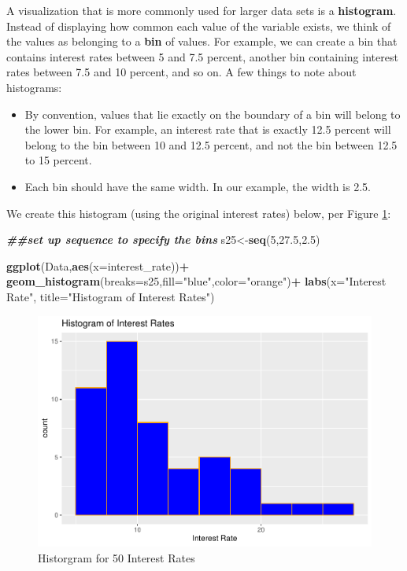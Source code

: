 \documentclass[
]{book}
\newenvironment{Shaded}{\begin{snugshade}}{\end{snugshade}}
\newcommand{\AttributeTok}[1]{\textcolor[rgb]{0.13,0.29,0.53}{#1}}
\newcommand{\DecValTok}[1]{\textcolor[rgb]{0.00,0.00,0.81}{#1}}
\newcommand{\DocumentationTok}[1]{\textcolor[rgb]{0.56,0.35,0.01}{\textbf{\textit{#1}}}}
\newcommand{\FloatTok}[1]{\textcolor[rgb]{0.00,0.00,0.81}{#1}}
\newcommand{\FunctionTok}[1]{\textcolor[rgb]{0.13,0.29,0.53}{\textbf{#1}}}
\newcommand{\NormalTok}[1]{#1}
\newcommand{\OtherTok}[1]{\textcolor[rgb]{0.56,0.35,0.01}{#1}}
\newcommand{\SpecialCharTok}[1]{\textcolor[rgb]{0.81,0.36,0.00}{\textbf{#1}}}
\newcommand{\StringTok}[1]{\textcolor[rgb]{0.31,0.60,0.02}{#1}}
\begin{document}
A visualization that is more commonly used for larger data sets is a \textbf{histogram}. Instead of displaying how common each value of the variable exists, we think of the values as belonging to a \textbf{bin} of values. For example, we can create a bin that contains interest rates between 5 and 7.5 percent, another bin containing interest rates between 7.5 and 10 percent, and so on. A few things to note about histograms:

\begin{itemize}
\item
  By convention, values that lie exactly on the boundary of a bin will belong to the lower bin. For example, an interest rate that is exactly 12.5 percent will belong to the bin between 10 and 12.5 percent, and not the bin between 12.5 to 15 percent.
\item
  Each bin should have the same width. In our example, the width is 2.5.
\end{itemize}

We create this histogram (using the original interest rates) below, per Figure \ref{fig:hist}:

\begin{Shaded}
\begin{Highlighting}[]
\DocumentationTok{\#\#set up sequence to specify the bins}
\NormalTok{s25}\OtherTok{\textless{}{-}}\FunctionTok{seq}\NormalTok{(}\DecValTok{5}\NormalTok{,}\FloatTok{27.5}\NormalTok{,}\FloatTok{2.5}\NormalTok{)}

\FunctionTok{ggplot}\NormalTok{(Data,}\FunctionTok{aes}\NormalTok{(}\AttributeTok{x=}\NormalTok{interest\_rate))}\SpecialCharTok{+}
  \FunctionTok{geom\_histogram}\NormalTok{(}\AttributeTok{breaks=}\NormalTok{s25,}\AttributeTok{fill=}\StringTok{"blue"}\NormalTok{,}\AttributeTok{color=}\StringTok{"orange"}\NormalTok{)}\SpecialCharTok{+}
  \FunctionTok{labs}\NormalTok{(}\AttributeTok{x=}\StringTok{"Interest Rate"}\NormalTok{, }\AttributeTok{title=}\StringTok{"Histogram of Interest Rates"}\NormalTok{)}
\end{Highlighting}
\end{Shaded}

\begin{figure}
\centering
\includegraphics{bookdown-demo_files/figure-latex/hist-1.pdf}
\caption{\label{fig:hist}Historgram for 50 Interest Rates}
\end{figure}
\end{document}
